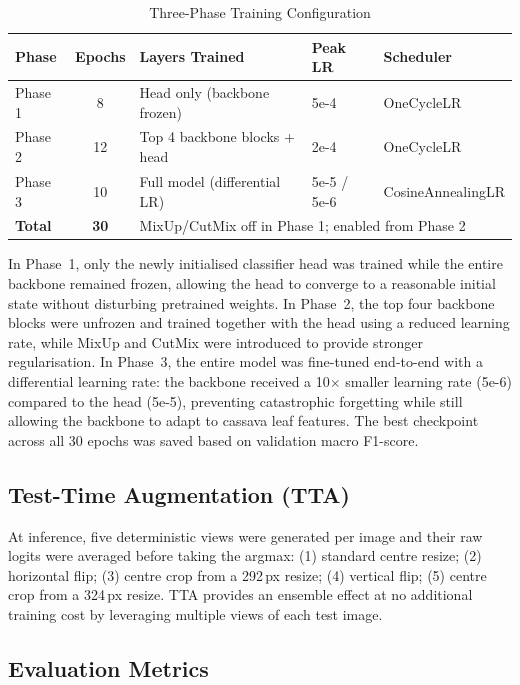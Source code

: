 \documentclass[12pt,a4paper]{article}
\begin{document}
\begin{table}[H]
\centering
\caption{Three-Phase Training Configuration}
\label{tab:phases}
\begin{tabular}{|l|c|l|l|l|}
    \hline
    \textbf{Phase} & \textbf{Epochs} & \textbf{Layers Trained} & \textbf{Peak LR} & \textbf{Scheduler} \\
    \hline
    Phase 1 &  8 & Head only (backbone frozen)       & 5e-4 & OneCycleLR \\
    \hline
    Phase 2 & 12 & Top 4 backbone blocks + head       & 2e-4 & OneCycleLR \\
    \hline
    Phase 3 & 10 & Full model (differential LR)       & 5e-5 / 5e-6 & CosineAnnealingLR \\
    \hline
    \textbf{Total} & \textbf{30} & \multicolumn{3}{l|}{MixUp/CutMix off in Phase 1; enabled from Phase 2} \\
    \hline
\end{tabular}
\end{table}

In Phase~1, only the newly initialised classifier head was trained while the entire backbone remained frozen, allowing the head to converge to a reasonable initial state without disturbing pretrained weights. In Phase~2, the top four backbone blocks were unfrozen and trained together with the head using a reduced learning rate, while MixUp and CutMix were introduced to provide stronger regularisation. In Phase~3, the entire model was fine-tuned end-to-end with a differential learning rate: the backbone received a 10$\times$ smaller learning rate (5e-6) compared to the head (5e-5), preventing catastrophic forgetting while still allowing the backbone to adapt to cassava leaf features. The best checkpoint across all 30 epochs was saved based on validation macro F1-score.

\subsection{Test-Time Augmentation (TTA)}

At inference, five deterministic views were generated per image and their raw logits were averaged before taking the argmax: (1) standard centre resize; (2) horizontal flip; (3) centre crop from a 292\,px resize; (4) vertical flip; (5) centre crop from a 324\,px resize. TTA provides an ensemble effect at no additional training cost by leveraging multiple views of each test image.

\subsection{Evaluation Metrics}
\end{document}
